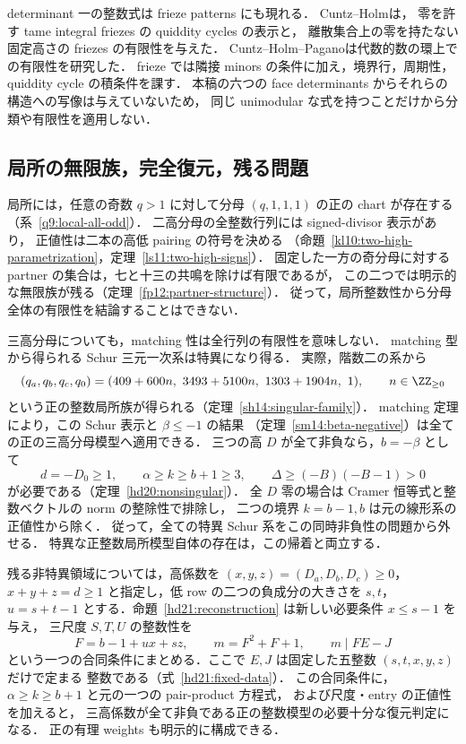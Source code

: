determinant 一の整数式は frieze patterns にも現れる．
Cuntz--Holm\cite[\S\S2--3 and~7]{CuntzHolmFriezes}は，
零を許す tame integral friezes の quiddity cycles の表示と，
離散集合上の零を持たない固定高さの friezes の有限性を与えた．
Cuntz--Holm--Pagano\cite{CuntzHolmPagano}は代数的数の環上での有限性を研究した．
frieze では隣接 minors の条件に加え，境界行，周期性，quiddity cycle の積条件を課す．
本稿の六つの face determinants からそれらの構造への写像は与えていないため，
同じ unimodular な式を持つことだけから分類や有限性を適用しない．

\subsection{局所の無限族，完全復元，残る問題}

局所には，任意の奇数 $q>1$ に対して分母 $(q,1,1,1)$ の正の chart が存在する
（系~\ref{q9:local-all-odd}）．
二高分母の全整数行列には signed-divisor 表示があり，
正値性は二本の高低 pairing の符号を決める
（命題~\ref{kl10:two-high-parametrization}，定理~\ref{ls11:two-high-signs}）．
固定した一方の奇分母に対する partner の集合は，七と十三の共鳴を除けば有限であるが，
この二つでは明示的な無限族が残る（定理~\ref{fp12:partner-structure}）．
従って，局所整数性から分母全体の有限性を結論することはできない．

三高分母についても，matching 性は全行列の有限性を意味しない．
matching 型から得られる Schur 三元一次系は特異になり得る．
実際，階数二の系から
\[
 (q_a,q_b,q_c,q_0)
 =(409+600n,\ 3493+5100n,\ 1303+1904n,\ 1),
 \qquad n\in\ZZ_{\ge0}
\]
という正の整数局所族が得られる（定理~\ref{sh14:singular-family}）．
matching 定理により，この Schur 表示と $\beta\le-1$ の結果
（定理~\ref{sm14:beta-negative}）は全ての正の三高分母模型へ適用できる．
三つの高 $D$ が全て非負なら，$b=-\beta$ として
\[
 d=-D_0\ge1,\qquad \alpha\ge k\ge b+1\ge3,
 \qquad \Delta\ge(-B)(-B-1)>0
\]
が必要である（定理~\ref{hd20:nonsingular}）．
全 $D$ 零の場合は Cramer 恒等式と整数ベクトルの norm の整除性で排除し，
二つの境界 $k=b-1,b$ は元の線形系の正値性から除く．
従って，全ての特異 Schur 系をこの同時非負性の問題から外せる．
特異な正整数局所模型自体の存在は，この帰着と両立する．

残る非特異領域については，高係数を
$(x,y,z)=(D_a,D_b,D_c)\ge0$，$x+y+z=d\ge1$ と指定し，低 row の二つの負成分の大きさを $s,t$，
$u=s+t-1$ とする．命題~\ref{hd21:reconstruction} は新しい必要条件 $x\le s-1$ を与え，
三尺度 $S,T,U$ の整数性を
\[
 F=b-1+ux+sz,\qquad m=F^2+F+1,\qquad m\mid FE-J
\]
という一つの合同条件にまとめる．ここで $E,J$ は固定した五整数 $(s,t,x,y,z)$ だけで定まる
整数である（式~\eqref{hd21:fixed-data}）．
この合同条件に，$\alpha\ge k\ge b+1$ と元の一つの pair-product 方程式，
および尺度・entry の正値性を加えると，
三高係数が全て非負である正の整数模型の必要十分な復元判定になる．
正の有理 weights も明示的に構成できる．

